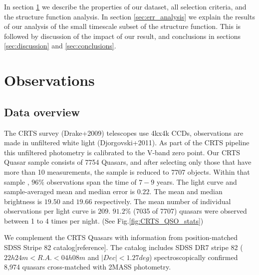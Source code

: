 \documentclass[a4paper,fleqn,usenatbib]{mnras}
\begin{document}
In section \ref{sec:obs} we describe the properties of our dataset, all selection criteria, and the structure function analysis.  In section \ref{sec:err_analysis} we explain the results of our analysis of the small timescale subset of the structure function. This is followed by discussion of the impact of our result, and conclusions in sections \ref{sec:discussion} and \ref{sec:conclusions}.
 

\section{Observations}
\label{sec:obs}

\subsection{Data overview}

The CRTS survey (Drake+2009) telescopes use 4kx4k CCDs, observations are made in unfiltered white light (Djorgovski+2011).  As part of the CRTS pipeline this unfiltered photometry is calibrated to the V-band zero point. Our CRTS Quasar sample consists of 7754 Quasars, and after selecting only those that have more than 10 measurements, the sample is reduced to 7707 objects. Within that sample , $96 \% $ observations span the time of $7-9$ years. The light curve and sample-averaged mean and median error is $0.22$. The mean and median brightness is $19.50$ and  $19.66$ respectively. The mean number of individual observations per light curve  is $209$. $91.2\%$ (7035 of 7707) quasars were observed between 1 to 4 times per night.  (See Fig.\ref{fig:CRTS_QSO_stats})

We complement the CRTS Quasars with information from position-matched SDSS Stripe 82 catalog[reference]. The catalog includes SDSS DR7 stripe 82 ($22h 24m < R.A. < 04h 08m$ and $| Dec | < 1.27 deg$) spectroscopically confirmed  8,974 quasars cross-matched with 2MASS photometry. 
\end{document}
